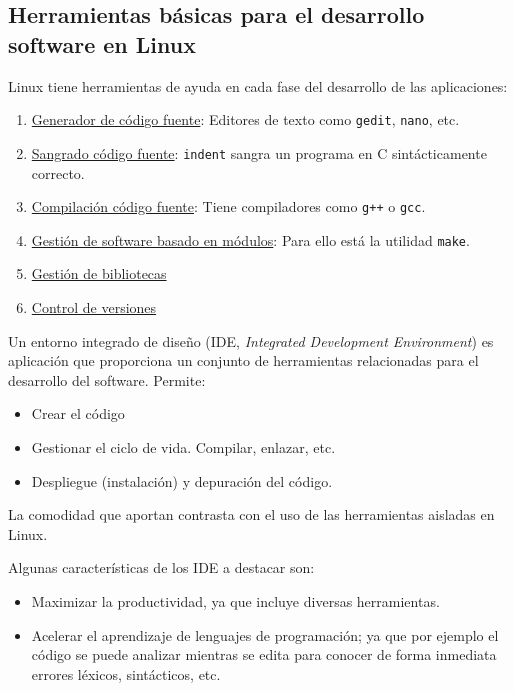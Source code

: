 \subsection{Herramientas básicas para el desarrollo software en Linux}

Linux tiene herramientas de ayuda en cada fase del desarrollo de las aplicaciones:
\begin{enumerate}
    \item \underline{Generador de código fuente}: Editores de texto como \verb|gedit|, \verb|nano|, etc.

    \item \underline{Sangrado código fuente}: \verb|indent| sangra un programa en C sintácticamente correcto.

    \item \underline{Compilación código fuente}: Tiene compiladores como \verb|g++| o \verb|gcc|.

    \item \underline{Gestión de software basado en módulos}: Para ello está la utilidad \verb|make|.

    \item \underline{Gestión de bibliotecas}
    
    \item \underline{Control de versiones}
\end{enumerate}

\begin{definicion}[IDE]

Un entorno integrado de diseño (IDE, \textit{Integrated Development Environment}) es aplicación que proporciona un conjunto de herramientas relacionadas para el desarrollo del software. Permite:
\begin{itemize}
    \item Crear el código
    \item Gestionar el ciclo de vida. Compilar, enlazar, etc.
    \item Despliegue (instalación) y depuración del código.
\end{itemize}

La comodidad que aportan contrasta con el uso de las herramientas aisladas en Linux.
\end{definicion}
Algunas características de los IDE a destacar son:
\begin{itemize}
    \item Maximizar la productividad, ya que incluye diversas herramientas.

    \item Acelerar el aprendizaje de lenguajes de programación; ya que por ejemplo el código se puede analizar mientras se edita para conocer de forma inmediata errores léxicos, sintácticos, etc.
\end{itemize}


